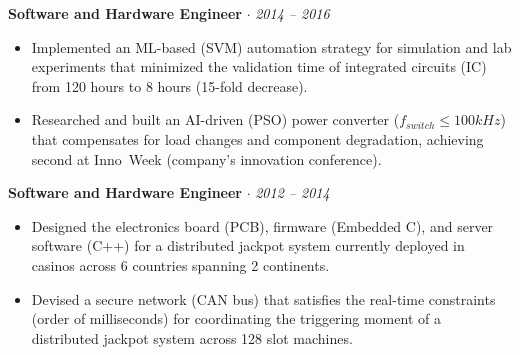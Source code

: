 \documentclass[11pt]{article}
\begin{document}
\vspace{-2mm}
\textbf{Software and Hardware Engineer} \enskip $\cdot$  \hfill  \textit{\footnotesize 2014 -- 2016}
\begin{rightrule}
    \begin{itemize}[left=5pt]
    \item {Implemented an ML-based (SVM) automation strategy for simulation and lab experiments that minimized the validation time of integrated circuits (IC) from 120 hours to 8 hours (15-fold decrease).}
    \item {Researched and built an AI-driven (PSO) power converter ($f_{\scriptscriptstyle switch} \leq 100kHz$) that compensates for load changes and component degradation, achieving second at Inno~Week (company's innovation conference).}
    \end{itemize}
\end{rightrule}
\vspace{-2mm}
\textbf{Software and Hardware Engineer} \enskip $\cdot$  \hfill \textit{\footnotesize 2012 -- 2014}
\begin{rightrule}
    \begin{itemize}[left=5pt]
    \item Designed the electronics board (PCB), firmware (Embedded C), and server software (C++) for a distributed jackpot system currently deployed in casinos across 6 countries spanning 2 continents.
    \item Devised a secure network (CAN bus) that satisfies the real-time constraints (order of milliseconds) for coordinating the triggering moment of a distributed jackpot system across 128 slot machines.
    \end{itemize}
\end{rightrule}
\end{document}
